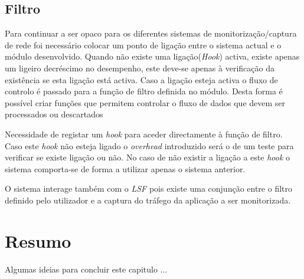 \subsection{Filtro}

Para continuar a ser opaco para os diferentes sistemas de monitorização/captura de rede foi necessário colocar um ponto de ligação entre o sistema actual e o módulo desenvolvido.
 Quando não existe uma ligação(\textit{Hook}) activa, existe apenas um ligeiro decréscimo no desempenho, este deve-se apenas à verificação da existência se esta ligação está activa.
 Caso a ligação esteja activa o fluxo de controlo é passado para a função de filtro definida no módulo.
 Desta forma é possível criar funções que permitem controlar o fluxo de dados que devem ser processados ou descartados

Necessidade de registar um \textit{hook} para aceder directamente à função de filtro.
 Caso este \textit{hook} não esteja ligado o \textit{overhead} introduzido será o de um teste para verificar se existe ligação ou não.
 No caso de não existir a ligação a este \textit{hook} o sistema comporta-se de forma a utilizar apenas o sistema anterior.

O sistema interage também com o \textit{LSF} pois existe uma conjunção entre o filtro definido pelo utilizador e a captura do tráfego da aplicação a ser monitorizada.

\section{Resumo}

Algumas ideias para concluir este capitulo ...

